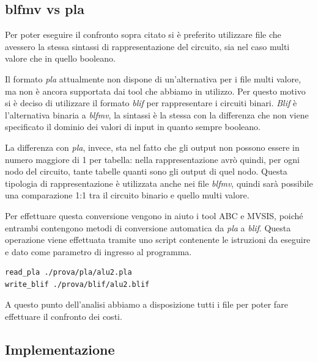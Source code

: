 \documentclass[
]{book}
\begin{document}
\newpage

\hypertarget{blfmv-vs-pla}{%
\subsection{blfmv vs pla}\label{blfmv-vs-pla}}

Per poter eseguire il confronto sopra citato si è preferito utilizzare file che avessero la stessa sintassi di rappresentazione del circuito, sia nel caso multi valore che in quello booleano.

Il formato \emph{pla} attualmente non dispone di un'alternativa per i file multi valore, ma non è ancora supportata dai tool che abbiamo in utilizzo. Per questo motivo si è deciso di utilizzare il formato \emph{blif} per rappresentare i circuiti binari. \emph{Blif} è l'alternativa binaria a \emph{blfmv}, la sintassi è la stessa con la differenza che non viene specificato il dominio dei valori di input in quanto sempre booleano.

La differenza con \emph{pla}, invece, sta nel fatto che gli output non possono essere in numero maggiore di 1 per tabella: nella rappresentazione avrò quindi, per ogni nodo del circuito, tante tabelle quanti sono gli output di quel nodo. Questa tipologia di rappresentazione è utilizzata anche nei file \emph{blfmv}, quindi sarà possibile una comparazione 1:1 tra il circuito binario e quello multi valore.

Per effettuare questa conversione vengono in aiuto i tool ABC e MVSIS, poiché entrambi contengono metodi di conversione automatica da \emph{pla} a \emph{blif}. Questa operazione viene effettuata tramite uno script contenente le istruzioni da eseguire e dato come parametro di ingresso al programma. \citep{kukimoto1996blif}

\begin{verbatim}
read_pla ./prova/pla/alu2.pla
write_blif ./prova/blif/alu2.blif
\end{verbatim}

A questo punto dell'analisi abbiamo a disposizione tutti i file per poter fare effettuare il confronto dei costi.

\newpage

\hypertarget{implementazione}{%
\subsection{Implementazione}\label{implementazione}}
\end{document}
